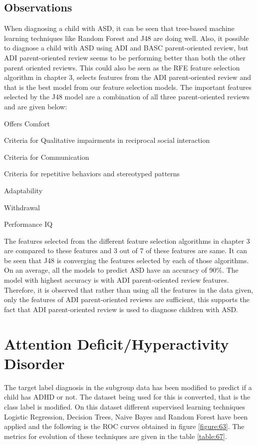 \subsection{Observations}
When diagnosing a child with ASD, it can be seen that tree-based machine learning techniques like Random Forest and J48 are doing well. Also, it possible to diagnose a child with ASD using ADI and BASC parent-oriented review, but ADI parent-oriented review seems to be performing better than both the other parent oriented reviews. This could also be seen as the RFE feature selection algorithm in chapter 3, selects features from the ADI parent-oriented review and that is the best model from our feature selection models. The important features selected by the J48 model are a combination of all three parent-oriented reviews and are given below:
\begin{compactenum}
\item Offers Comfort
\item Criteria for Qualitative impairments in reciprocal social interaction
\item Criteria for Communication
\item Criteria for repetitive behaviors and stereotyped patterns
\item Adaptability
\item Withdrawal
\item Performance IQ 
\end{compactenum}

The features selected from the different feature selection algorithms in chapter 3 are compared to these features and 3 out of 7 of these features are same. It can be seen that J48 is converging the features selected by each of those algorithms. On an average, all the models to predict ASD have an accuracy of 90\%. The model with highest accuracy is with ADI parent-oriented review features. Therefore, it is observed that rather than using all the features in the data given, only the features of ADI parent-oriented reviews are sufficient, this supports the fact that ADI parent-oriented review is used to diagnose children with ASD.

\section{Attention Deficit/Hyperactivity Disorder}
The target label diagnosis in the subgroup data has been modified to predict if a child has ADHD or not. The dataset being used for this is converted, that is the class label is modified. On this dataset different supervised learning techniques Logistic Regression, Decision Trees, Naive Bayes and Random Forest have been applied and the following is the ROC curves obtained in figure \ref{figure:63}. The metrics for evolution of these techniques are given in the table \ref{table:67}.

